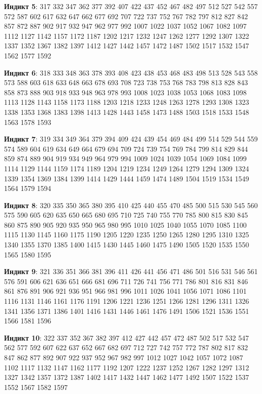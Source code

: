 \textbf{Индикт 5}: 317 332 347 362 377 392 407 422 437 452 467 482 497 512 527 542 557 572 587 602 617 632 647 662 677 692 707 722 737 752 767 782 797 812 827 842 857 872 887 902 917 932 947 962 977 992 1007 1022 1037 1052 1067 1082 1097 1112 1127 1142 1157 1172 1187 1202 1217 1232 1247 1262 1277 1292 1307 1322 1337 1352 1367 1382 1397 1412 1427 1442 1457 1472 1487 1502 1517 1532 1547 1562 1577 1592

\textbf{Индикт 6}: 318 333 348 363 378 393 408 423 438 453 468 483 498 513 528 543 558 573 588 603 618 633 648 663 678 693 708 723 738 753 768 783 798 813 828 843 858 873 888 903 918 933 948 963 978 993 1008 1023 1038 1053 1068 1083 1098 1113 1128 1143 1158 1173 1188 1203 1218 1233 1248 1263 1278 1293 1308 1323 1338 1353 1368 1383 1398 1413 1428 1443 1458 1473 1488 1503 1518 1533 1548 1563 1578 1593

\textbf{Индикт 7}: 319 334 349 364 379 394 409 424 439 454 469 484 499 514 529 544 559 574 589 604 619 634 649 664 679 694 709 724 739 754 769 784 799 814 829 844 859 874 889 904 919 934 949 964 979 994 1009 1024 1039 1054 1069 1084 1099 1114 1129 1144 1159 1174 1189 1204 1219 1234 1249 1264 1279 1294 1309 1324 1339 1354 1369 1384 1399 1414 1429 1444 1459 1474 1489 1504 1519 1534 1549 1564 1579 1594

\textbf{Индикт 8}: 320 335 350 365 380 395 410 425 440 455 470 485 500 515 530 545 560 575 590 605 620 635 650 665 680 695 710 725 740 755 770 785 800 815 830 845 860 875 890 905 920 935 950 965 980 995 1010 1025 1040 1055 1070 1085 1100 1115 1130 1145 1160 1175 1190 1205 1220 1235 1250 1265 1280 1295 1310 1325 1340 1355 1370 1385 1400 1415 1430 1445 1460 1475 1490 1505 1520 1535 1550 1565 1580 1595

\textbf{Индикт 9}: 321 336 351 366 381 396 411 426 441 456 471 486 501 516 531 546 561 576 591 606 621 636 651 666 681 696 711 726 741 756 771 786 801 816 831 846 861 876 891 906 921 936 951 966 981 996 1011 1026 1041 1056 1071 1086 1101 1116 1131 1146 1161 1176 1191 1206 1221 1236 1251 1266 1281 1296 1311 1326 1341 1356 1371 1386 1401 1416 1431 1446 1461 1476 1491 1506 1521 1536 1551 1566 1581 1596

\textbf{Индикт 10}: 322 337 352 367 382 397 412 427 442 457 472 487 502 517 532 547 562 577 592 607 622 637 652 667 682 697 712 727 742 757 772 787 802 817 832 847 862 877 892 907 922 937 952 967 982 997 1012 1027 1042 1057 1072 1087 1102 1117 1132 1147 1162 1177 1192 1207 1222 1237 1252 1267 1282 1297 1312 1327 1342 1357 1372 1387 1402 1417 1432 1447 1462 1477 1492 1507 1522 1537 1552 1567 1582 1597

